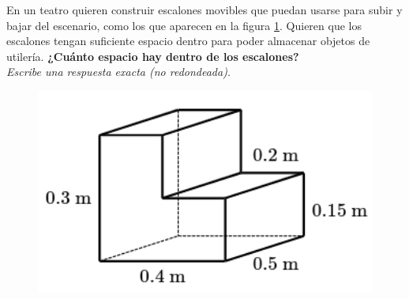 \question[10] En un teatro quieren construir escalones movibles que puedan
usarse para subir y bajar del escenario,
como los que aparecen en la figura \ref{fig:vol_area_01}.
Quieren que los escalones tengan suficiente espacio dentro para poder
almacenar objetos de utilería.
\textbf{¿Cuánto espacio hay dentro de los escalones?}\\
\textit{Escribe una respuesta exacta (no redondeada).}

\begin{minipage}{0.3\linewidth}
    \begin{figure}[H]
        \begin{center}
            \includegraphics[width=1\textwidth]{../images/vol_area_01}
        \end{center}
        \caption{}
        \label{fig:vol_area_01}
    \end{figure}
\end{minipage}
\begin{minipage}{0.7\linewidth}
    \begin{solutionbox}{6cm}
    \end{solutionbox}
\end{minipage}
